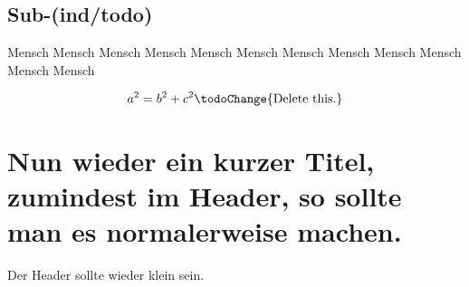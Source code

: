 \section{Sub-(ind/todo)}%
\label{sec:introduction:Sub-indtodo}%
\lipsum[1-1] Mensch
%
\lipsum[1-3] Mensch\newline%
\lipsum[1-4] Mensch%
\lipsum[1-5] Mensch%
\lipsum[1-6] Mensch%
\lipsum[1-7] Mensch%
\lipsum[1-8] Mensch%
\lipsum[1-9] Mensch\newline%
\lipsum[1-10] Mensch\newline%
\lipsum[1-11] Mensch\newline%
\lipsum[1-12] Mensch\newline%
\lipsum[1-13] Mensch%
\lipsum[1-8]\lipsum[1-18] %
\lipsum[1-8]%

\begin{equation}
	a^2=b^2+c^2 \textrm{\todoChange{Delete this.}}
\end{equation}

\newpage\TUMStandardAreaMain%
\chapter[Nun wieder ein kurzer Titel.]{Nun wieder ein kurzer Titel, zumindest im Header, so sollte man es normalerweise machen.}\label{chap:Nun wieder ein kurzer Titel}%
Der Header sollte wieder klein sein. \lipsum[1-30]%


